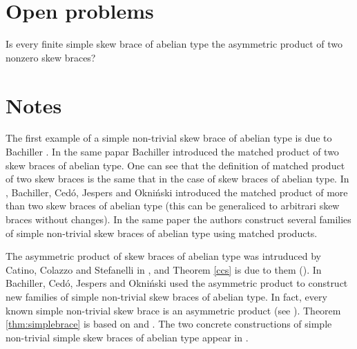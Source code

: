 \section{Open problems}

\begin{problem}
Is every finite simple skew brace of abelian type the asymmetric product of two nonzero skew braces?
\end{problem}

\section{Notes}

The first example of a simple non-trivial  skew brace of abelian type is due to Bachiller \cite{MR3763276}. 
In the same papar Bachiller introduced the matched product of two skew braces of abelian type. One can see that the definition of matched product of two skew braces is the same that in the case of skew braces of abelian type. 
In \cite{MR3812099}, Bachiller, Ced\'o, Jespers and Okni\'{n}ski introduced the matched product of more than two skew braces of abelian type (this can be generaliced to arbitrari skew braces without changes). In the same paper the authors construct several families of  simple non-trivial skew braces of abelian type using matched products.

The asymmetric product of skew braces of abelian type was intruduced by Catino, Colazzo and Stefanelli in \cite{MR3478858}, and Theorem \ref{ccs} is due to them (\cite[Theorem 3]{MR3478858}).  In \cite{MR4020748} Bachiller, Ced\'o, Jespers and Okni\'{n}ski used the asymmetric product to construct  new families of simple non-trivial skew braces of abelian type. In fact, every known simple non-trivial skew brace is an asymmetric product (see \cite{MR4020748, MR4161288, MR4122077}).
Theorem \ref{thm:simplebrace} is based on \cite[Theorem 3.6]{MR3812099} and \cite[Theorem 6.2]{MR4020748}. The two concrete constructions of simple non-trivial simple skew braces of abelian type appear in \cite{MR3812099,  MR4161288}.
